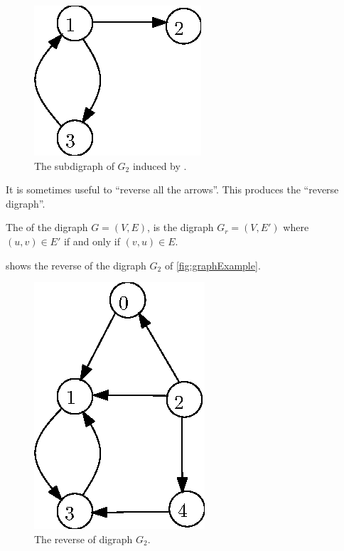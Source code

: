 \begin{figure}[h]
\begin{center}
\includegraphics{figs/wInduced.eps}
\end{center}
\caption{The subdigraph of $G_2$ induced by .}
\label{fig:induced}
\end{figure}

It is sometimes useful to ``reverse all the arrows''. This produces the ``reverse digraph''.

\begin{Definition}
The  of the digraph $G = (V, E)$, is the digraph $G_r = (V, E')$ where $(u, v)\in E'$ if and only if $(v, u)\in E$.
\end{Definition}

\begin{Example}
 shows the reverse of the digraph $G_2$ of \cref{fig:graphExample}.
\end{Example}

\begin{figure}[h]
\begin{center}
\includegraphics{figs/wReverse.eps}
\end{center}
\caption{The reverse of digraph $G_2$.}
\label{fig:reverse}
\end{figure}

